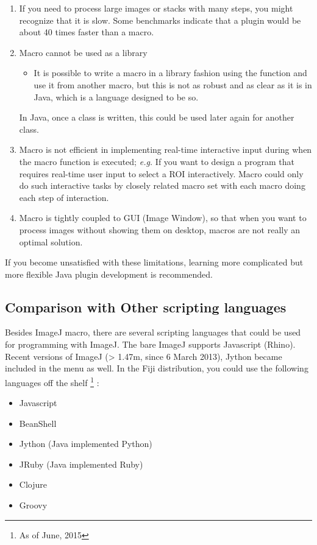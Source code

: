 \begin{enumerate}
\item If you need to process large images or stacks with many steps, 
you might recognize that it is slow. Some benchmarks indicate that a plugin would be about 40 times faster than a macro.

\item Macro cannot be used as a library
\begin{itemize}
  \item It is possible to write a macro in a library fashion using the function  and use it from another macro, but this is not as robust and as clear as it is in Java, which is a language designed to be so.
\end{itemize}
In Java, once a class is written, this could be used later again for another class.

\item Macro is not efficient in implementing real-time interactive input 
during when the macro function is executed; 
\textit{e.g.} If you want to design a program that requires real-time user input 
to select a ROI interactively.  
Macro could only do such interactive tasks by closely related macro set with each macro doing each step of interaction.

\item Macro is tightly coupled to GUI (Image Window), so that when you want to process images without showing them on desktop, macros are not really an optimal solution.

\end{enumerate}

If you become unsatisfied with these limitations, 
learning more complicated but more flexible Java plugin development is recommended.

\subsection{Comparison with Other scripting languages}

Besides ImageJ macro, there are several scripting languages that
could be used for programming with ImageJ. The bare ImageJ supports Javascript (Rhino). Recent versions of ImageJ (> 1.47m,  since 6 March 2013), Jython became included in the menu as well. 
In the Fiji distribution, you could use the following languages off the shelf
\footnote{As of June, 2015}
:

\begin{itemize}
 \item Javascript
 \item BeanShell
 \item Jython (Java implemented Python)
 \item JRuby (Java implemented Ruby)
 \item Clojure
 \item Groovy
 
\end{itemize}

